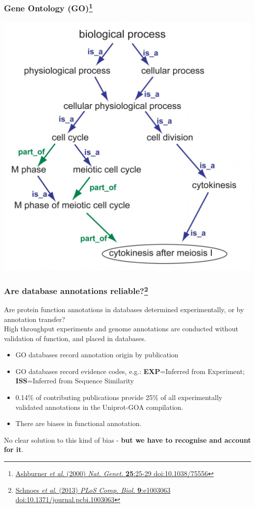 \begin{frame}
  \frametitle{Gene Ontology (GO)\footnote{\tiny{\href{http://dx.doi.org/10.1038/75556}{Ashburner \textit{et al}. (2000) \textit{Nat. Genet.} \textbf{25}:25-29 doi:10.1038/75556}}}}
  \begin{center}
    \includegraphics[height=0.7\textheight]{images/go_example}
  \end{center}
\end{frame}

\begin{frame}
  \frametitle{Are database annotations reliable?\footnote{\tiny{\href{http://dx.doi.org/10.1371/journal.pcbi.1003063}{Schnoes \textit{et al}. (2013) \textit{PLoS Comp. Biol.} \textbf{9}:e1003063 doi:10.1371/journal.pcbi.1003063}}}}
  Are protein function annotations in databases determined experimentally, or by annotation transfer?\\[0.1cm]
  High throughput experiments and genome annotations are conducted without validation of function, and placed in databases.\\[0.1cm]
  \begin{itemize}
    \item GO databases record annotation origin by publication 
    \item GO databases record evidence codes, e.g.: \textbf{EXP}=Inferred from Experiment; \textbf{ISS}=Inferred from Sequence Similarity
    \item 0.14\% of contributing publications provide 25\% of all experimentally validated annotations in the Uniprot-GOA compilation.
    \item There are biases in functional annotation.
  \end{itemize}
  No clear solution to this kind of bias - \textbf{but we have to recognise and account for it}.
\end{frame}

